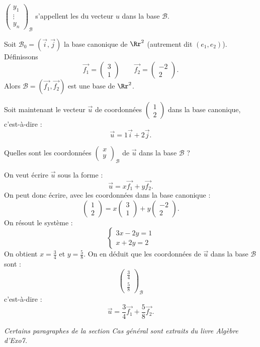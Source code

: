 \documentclass[11pt,class=report,crop=false]{standalone}
\begin{document}
$\left(\begin{smallmatrix} y_1\\ \vdots \\ y_n \end{smallmatrix}\right)_{\mathcal{B}}$ s'appellent les  du vecteur $u$ dans la base $\mathcal{B}$.


\begin{exemple}
Soit $\mathcal{B}_0 = (\vec i, \vec j)$ la base canonique de $\Rr^2$ (autrement dit $(e_1,e_2)$).
Définissons 
$$\vec {f_1} = \begin{pmatrix} 3\\1 \end{pmatrix}\qquad
\vec {f_2} = \begin{pmatrix} -2\\2 \end{pmatrix}.$$
Alors $\mathcal{B} = (\vec {f_1}, \vec {f_2})$ est une base de $\Rr^2$.

Soit maintenant le vecteur $\vec u$ de coordonnées $\begin{pmatrix} 1\\2 \end{pmatrix}$ dans la base canonique, c'est-à-dire :
$$\vec u = 1 \vec i + 2 \vec j.$$

Quelles sont les coordonnées $\left(\begin{smallmatrix} x\\ y \end{smallmatrix}\right)_{\mathcal{B}}$ de $\vec u$ dans la base $\mathcal{B}$ ?


On veut écrire $\vec u$ sous la forme :
$$\vec u = x \vec {f_1} + y \vec {f_2}.$$
On peut donc écrire, avec les coordonnées dans la base canonique :
$$ \begin{pmatrix} 1\\2 \end{pmatrix} = x\begin{pmatrix} 3\\1 \end{pmatrix} + y\begin{pmatrix} -2\\2 \end{pmatrix}.$$
On résout le système :
$$\begin{cases}
3x - 2y = 1\\
x + 2y = 2
\end{cases}$$
On obtient $x = \frac34$ et $y = \frac58$.
On en déduit que les coordonnées de $\vec u$ dans la base $\mathcal{B}$ sont :
$$\begin{pmatrix} \frac34 \\ \frac58 \end{pmatrix}_{\mathcal{B}}$$
c'est-à-dire :
$$\vec u = \frac34 \vec {f_1} + \frac58 \vec {f_2}.$$
\end{exemple}


\vfill

\emph{Certains paragraphes de la section \emph{\og{}Cas général\fg{}} sont extraits du livre \emph{Algèbre} d'Exo7.}
\end{document}
